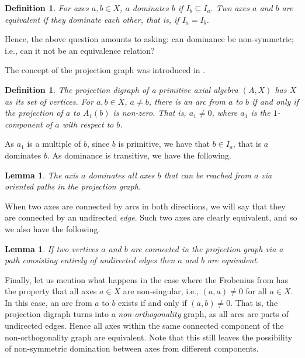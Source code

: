 \documentclass[12pt]{article}
\newtheorem{lemma}[theorem]{Lemma}
\newtheorem{definition}[theorem]{Definition}
\begin{document}
\begin{definition}
For axes $a,b\in X$, $a$ \emph{dominates} $b$ if $I_b\subseteq I_a$. Two axes $a$ and 
$b$ are \emph{equivalent} if they dominate each other, that is, if $I_a=I_b$.
\end{definition}

Hence, the above question amounts to asking: can dominance be non-symmetric; i.e., 
can it not be an equivalence relation?

The concept of the projection graph was introduced in \cite{kms}.

\begin{definition}
The \emph{projection digraph} of a primitive axial algebra $(A,X)$ has $X$ as its set 
of vertices. For $a,b\in X$, $a\neq b$, there is an arc from $a$ to $b$ if and only 
if the projection of $a$ to $A_1(b)$ is non-zero. That is, $a_1\neq 0$, where $a_1$ 
is the $1$-component of $a$ with respect to $b$. 
\end{definition}

As $a_1$ is a multiple of $b$, since $b$ is primitive, we have that $b\in I_a$, that 
is $a$ dominates $b$. As dominance is transitive, we have the following.

\begin{lemma}
The axis $a$ dominates all axes $b$ that can be reached from $a$ via oriented paths 
in the projection graph.
\end{lemma}

When two axes are connected by arcs in both directions, we will say that they are 
connected by an undirected \emph{edge}. Such two axes are clearly equivalent, and 
so we also have the following.

\begin{lemma}
If two vertices $a$ and $b$ are connected in the projection graph via a path 
consisting entirely of undirected edges then $a$ and $b$ are equivalent. 
\end{lemma}

Finally, let us mention what happens in the case where the Frobenius from has the 
property that all axes $a\in X$ are non-singular, i.e., $(a,a)\neq 0$ for all $a\in 
X$. In this case, an arc from $a$ to $b$ exists if and only if $(a,b)\neq 0$. That 
is, the projection digraph turns into a \emph{non-orthogonality} graph, as all arcs 
are parts of undirected edges. Hence all axes within the same connected component of 
the non-orthogonality graph are equivalent. Note that this still leaves the 
possibility of non-symmetric domination between axes from different components.
\end{document}
